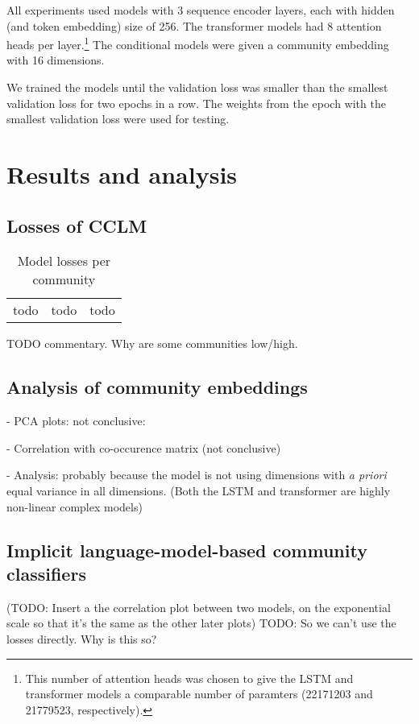 \documentclass[11pt,a4paper]{article}
\begin{document}
All experiments used models with \num{3} sequence encoder layers, 
each with hidden (and token embedding) size of \num{256}. 
The transformer models had \num{8} attention heads per layer.\footnote{
  This number of attention heads was chosen to give the LSTM and transformer
  models a comparable number of paramters 
  (\num{22171203} and \num{21779523}, respectively).}
The conditional models were given a community embedding with \num{16} dimensions. 

We trained the models until the validation loss was smaller than the smallest
validation loss for two epochs in a row. 
The weights from the epoch with the smallest validation loss were used for testing.


\section{Results and analysis}

\subsection{Losses of CCLM}

\begin{table}
  \centering
  \begin{tabular}{ccc}
    todo &todo &todo 
  \end{tabular}
  \caption{Model losses per community}
  \label{tab:losses}
\end{table}
TODO commentary. Why are some communities low/high.

\subsection{Analysis of community embeddings}

- PCA plots: not conclusive:

- Correlation with co-occurence matrix (not conclusive)

- Analysis: probably because the model is not using dimensions
with \emph{a priori} equal variance in all dimensions. (Both the LSTM and transformer are highly non-linear complex models)

\subsection{Implicit language-model-based community classifiers}

(TODO: Insert a the correlation plot between two models, on the exponential scale so that it's the same as the other later plots)
TODO: So we can't use the losses directly. Why is this so?
\end{document}
